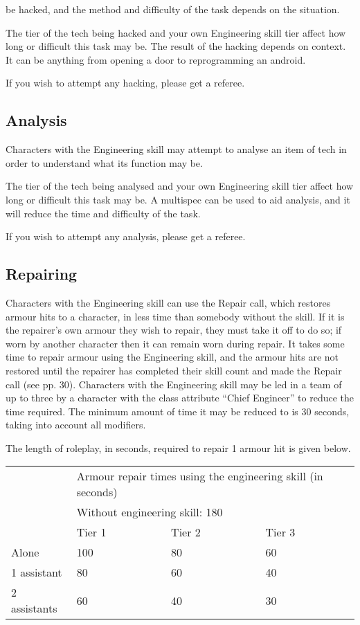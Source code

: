 be hacked, and the method and difficulty of the task depends on the situation.

The tier of the tech being hacked and your own Engineering skill tier affect how long or difficult this task may be. The result of the hacking depends on context. It can be anything from opening a door to reprogramming an android.

If you wish to attempt any hacking, please get a referee.

\subsection{Analysis}

Characters with the Engineering skill may attempt to analyse an item of tech in order to understand what its function may be.

The tier of the tech being analysed and your own Engineering skill tier affect how long or difficult this task may be. A multispec can be used to aid analysis, and it will reduce the time and difficulty of the task.

If you wish to attempt any analysis, please get a referee.

\subsection{Repairing}

Characters with the Engineering skill can use the Repair call, which restores armour hits to a character, in less time than somebody without the skill. If it is the repairer's own armour they wish to repair, they must take it off to do so; if worn by another character then it can remain worn during repair. It takes some time to repair armour using the Engineering skill, and the armour hits are not restored until the repairer has completed their skill count and made the Repair call (see pp. 30). Characters with the Engineering skill may be led in a team of up to three by a character with the class attribute ``Chief Engineer'' to reduce the time required. The minimum amount of time it may be reduced to is 30 seconds, taking into account all modifiers.

The length of roleplay, in seconds, required to repair 1 armour hit is given below.

\begin{table}
\begin{tabular}{|l|l|l|l|} \hline 
\multirow{2}{*}{}& \multicolumn{3}{|l|}{Armour repair times using the engineering skill (in seconds)} \\
\cline{2-2}\cline{3-3}\cline{4-4} & \multicolumn{3}{|l|}{Without engineering skill: 180} \\
\cline{2-2}\cline{3-3}\cline{4-4} & Tier 1 & Tier 2 & Tier 3 \\
 \hline Alone & 100 & 80 & 60 \\
 \hline 1 assistant & 80 & 60 & 40 \\
 \hline 2 assistants & 60 & 40 & 30 \\
 \hline \end{tabular}

\end{table}

